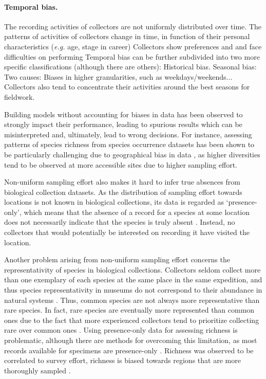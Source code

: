 \paragraph*{Temporal bias.}
The recording activities of collectors are not uniformly distributed over time.
The patterns of activities of collectors change in time, in function of their personal characteristics (\textit{e.g.} age, stage in career)
Collectors show preferences and and face difficulties on performing 
Temporal bias can be further subdivided into two more specific classifications (although there are others):
Historical bias. 
Seasonal bias: Two causes: 
Biases in higher granularities, such as weekdays/weekends...
Collectors also tend to concentrate their activities around the best seasons for fieldwork.



Building models without accounting for biases in data has been observed to strongly impact their performance, leading to spurious results which can be misinterpreted and, ultimately, lead to wrong decisions.
For instance, assessing patterns of species richness from species occurrence datasets has been shown to be particularly challenging due to geographical bias in data \cite{Hortal2007,Reddy2003}, as higher diversities tend to be observed at more accessible sites due to higher sampling effort.






Non-uniform sampling effort also makes it hard to infer true absences from biological collection datasets.
As the distribution of sampling effort towards locations is not known in biological collections, its data is regarded as `presence-only', which means that the absence of a record for a species at some location does not necessarily indicate that the species is truly absent \cite{Graham2004}.
Instead, no collectors that would potentially be interested on recording it have visited the location.

Another problem arising from non-uniform sampling effort concerns the representativity of species in biological collections.
Collectors seldom collect more than one exemplary of each species at the same place in the same expedition, and thus species representativity in museums do not correspond to their abundance in natural systems \cite{TerSteege2011}.
Thus, common species are not always more representative than rare species.
In fact, rare species are eventually more represented than common ones due to the fact that more experienced collectors tend to prioritize collecting rare over common ones \cite{Nelson1990}.
Using presence-only data for assessing richness is problematic, although there are methods for overcoming this limitation, as most records available for specimens are presence-only \cite{Zaniewski2002}.
Richness was observed to be correlated to survey effort, richness is biased towards regions that are more thoroughly sampled \cite{Hortal2007}.







